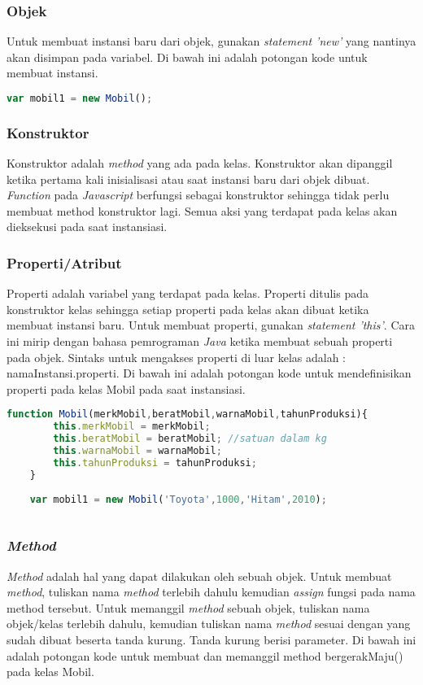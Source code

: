 \subsubsection{Objek}
Untuk membuat instansi baru dari objek, gunakan \textit{statement 'new'} yang nantinya akan disimpan pada variabel. Di bawah ini adalah potongan kode untuk membuat instansi.

\begin{lstlisting}[language=Javascript, caption=Membuat \textit{instance} mobil]
	var mobil1 = new Mobil();
\end{lstlisting}

\subsubsection{Konstruktor}
Konstruktor adalah \textit{method} yang ada pada kelas. Konstruktor akan dipanggil ketika pertama kali inisialisasi atau saat instansi baru dari objek dibuat. \textit{Function} pada \textit{Javascript} berfungsi sebagai konstruktor sehingga tidak perlu membuat method konstruktor lagi. Semua aksi yang terdapat pada kelas akan dieksekusi pada saat instansiasi.

\subsubsection{Properti/Atribut}
Properti adalah variabel yang terdapat pada kelas. Properti ditulis pada konstruktor kelas sehingga setiap properti pada kelas akan dibuat ketika membuat instansi baru. Untuk membuat properti, gunakan \textit{statement 'this'}. Cara ini mirip dengan bahasa pemrograman \textit{Java} ketika membuat sebuah properti pada objek. Sintaks untuk mengakses properti di luar kelas adalah : namaInstansi.properti. Di bawah ini adalah potongan kode untuk mendefinisikan properti pada kelas Mobil pada saat instansiasi.

\begin{lstlisting}[language=Javascript, caption=Mendefinisikan properti pada kelas Mobil]
	function Mobil(merkMobil,beratMobil,warnaMobil,tahunProduksi){
		this.merkMobil = merkMobil;
		this.beratMobil = beratMobil; //satuan dalam kg
		this.warnaMobil = warnaMobil;
		this.tahunProduksi = tahunProduksi;
	}
	
	var mobil1 = new Mobil('Toyota',1000,'Hitam',2010);
	
\end{lstlisting}

\subsubsection{\textit{Method}}
\textit{Method} adalah hal yang dapat dilakukan oleh sebuah objek. Untuk membuat \textit{method}, tuliskan nama \textit{method} terlebih dahulu kemudian \textit{assign} fungsi pada nama method tersebut. Untuk memanggil \textit{method} sebuah objek, tuliskan nama objek/kelas terlebih dahulu, kemudian tuliskan nama \textit{method} sesuai dengan yang sudah dibuat beserta tanda kurung. Tanda kurung berisi parameter. Di bawah ini adalah potongan kode untuk membuat dan memanggil method bergerakMaju() pada kelas Mobil.

